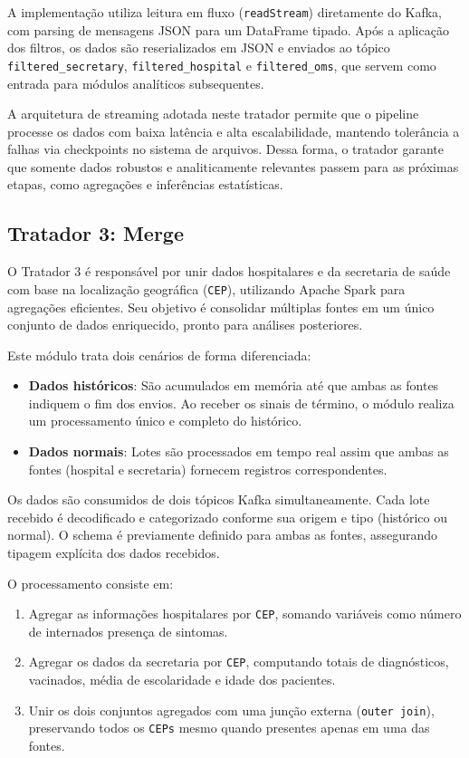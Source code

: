 \documentclass[a4paper,12pt]{article}
\begin{document}
A implementação utiliza leitura em fluxo (\texttt{readStream}) diretamente do Kafka, com parsing de mensagens JSON para um DataFrame tipado. Após a aplicação dos filtros, os dados são reserializados em JSON e enviados ao tópico \texttt{filtered\_secretary}, \texttt{filtered\_hospital} e \texttt{filtered\_oms}, que servem como entrada para módulos analíticos subsequentes.

A arquitetura de streaming adotada neste tratador permite que o pipeline processe os dados com baixa latência e alta escalabilidade, mantendo tolerância a falhas via checkpoints no sistema de arquivos. Dessa forma, o tratador garante que somente dados robustos e analiticamente relevantes passem para as próximas etapas, como agregações e inferências estatísticas.


\subsection{Tratador 3: Merge}

O Tratador 3 é responsável por unir dados hospitalares e da secretaria de saúde com base na localização geográfica (\texttt{CEP}), utilizando Apache Spark para agregações eficientes. Seu objetivo é consolidar múltiplas fontes em um único conjunto de dados enriquecido, pronto para análises posteriores.

Este módulo trata dois cenários de forma diferenciada:

\begin{itemize}
    \item \textbf{Dados históricos}: São acumulados em memória até que ambas as fontes indiquem o fim dos envios. Ao receber os sinais de término, o módulo realiza um processamento único e completo do histórico.
    \item \textbf{Dados normais}: Lotes são processados em tempo real assim que ambas as fontes (hospital e secretaria) fornecem registros correspondentes.
\end{itemize}

Os dados são consumidos de dois tópicos Kafka simultaneamente. Cada lote recebido é decodificado e categorizado conforme sua origem e tipo (histórico ou normal). O schema é previamente definido para ambas as fontes, assegurando tipagem explícita dos dados recebidos.

O processamento consiste em:
\begin{enumerate}
    \item Agregar as informações hospitalares por \texttt{CEP}, somando variáveis como número de internados presença de sintomas.
    \item Agregar os dados da secretaria por \texttt{CEP}, computando totais de diagnósticos, vacinados, média de escolaridade e idade dos pacientes.
    \item Unir os dois conjuntos agregados com uma junção externa (\texttt{outer join}), preservando todos os \texttt{CEPs} mesmo quando presentes apenas em uma das fontes.
\end{enumerate}
\end{document}
